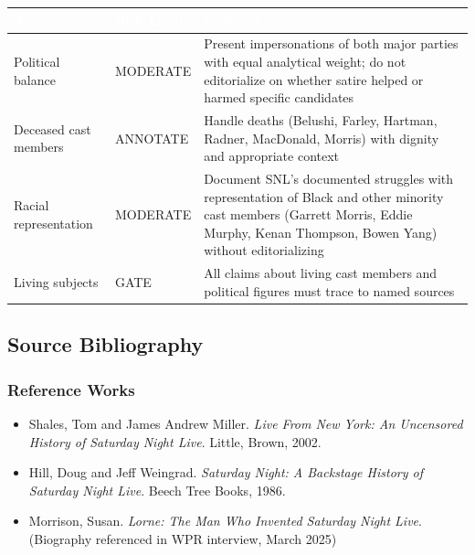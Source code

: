 \documentclass[11pt,letterpaper]{article}
\newcommand{\tableheader}[1]{\textbf{\sffamily\textcolor{white}{#1}}}
\begin{document}
\begin{center}
\begin{tabularx}{\textwidth}{L{4cm}L{3cm}X}
\toprule
{}
\tableheader{Area} & \tableheader{Risk Level} & \tableheader{Protocol} \\
\midrule
Political balance & MODERATE & Present impersonations of both major parties with equal analytical weight; do not editorialize on whether satire helped or harmed specific candidates \\
Deceased cast members & ANNOTATE & Handle deaths (Belushi, Farley, Hartman, Radner, MacDonald, Morris) with dignity and appropriate context \\
Racial representation & MODERATE & Document SNL's documented struggles with representation of Black and other minority cast members (Garrett Morris, Eddie Murphy, Kenan Thompson, Bowen Yang) without editorializing \\
Living subjects & GATE & All claims about living cast members and political figures must trace to named sources \\
\bottomrule
\end{tabularx}
\end{center}

\subsection{Source Bibliography}

\subsubsection{Reference Works}
\begin{itemize}[noitemsep]
  \item Shales, Tom and James Andrew Miller. \textit{Live From New York: An Uncensored History of Saturday Night Live}. Little, Brown, 2002.
  \item Hill, Doug and Jeff Weingrad. \textit{Saturday Night: A Backstage History of Saturday Night Live}. Beech Tree Books, 1986.
  \item Morrison, Susan. \textit{Lorne: The Man Who Invented Saturday Night Live}. (Biography referenced in WPR interview, March 2025)
\end{itemize}
\end{document}
